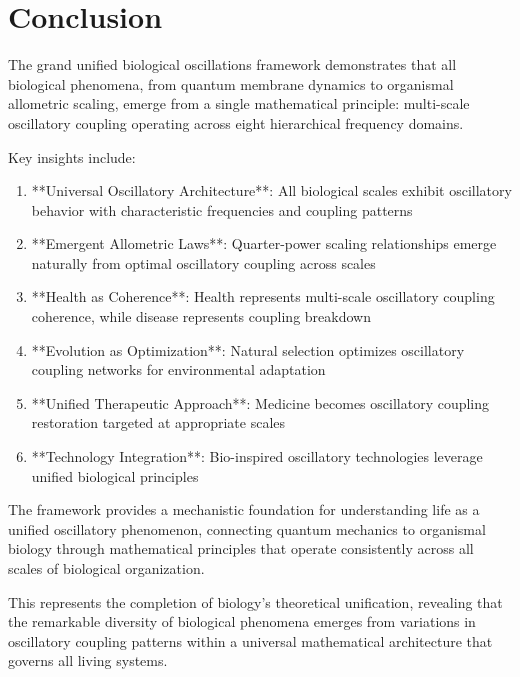 \documentclass[twocolumn]{article}
\begin{document}
\section{Conclusion}

The grand unified biological oscillations framework demonstrates that all biological phenomena, from quantum membrane dynamics to organismal allometric scaling, emerge from a single mathematical principle: multi-scale oscillatory coupling operating across eight hierarchical frequency domains.

Key insights include:

\begin{enumerate}
\item **Universal Oscillatory Architecture**: All biological scales exhibit oscillatory behavior with characteristic frequencies and coupling patterns
\item **Emergent Allometric Laws**: Quarter-power scaling relationships emerge naturally from optimal oscillatory coupling across scales
\item **Health as Coherence**: Health represents multi-scale oscillatory coupling coherence, while disease represents coupling breakdown
\item **Evolution as Optimization**: Natural selection optimizes oscillatory coupling networks for environmental adaptation
\item **Unified Therapeutic Approach**: Medicine becomes oscillatory coupling restoration targeted at appropriate scales
\item **Technology Integration**: Bio-inspired oscillatory technologies leverage unified biological principles
\end{enumerate}

The framework provides a mechanistic foundation for understanding life as a unified oscillatory phenomenon, connecting quantum mechanics to organismal biology through mathematical principles that operate consistently across all scales of biological organization.

This represents the completion of biology's theoretical unification, revealing that the remarkable diversity of biological phenomena emerges from variations in oscillatory coupling patterns within a universal mathematical architecture that governs all living systems.



\end{document}
